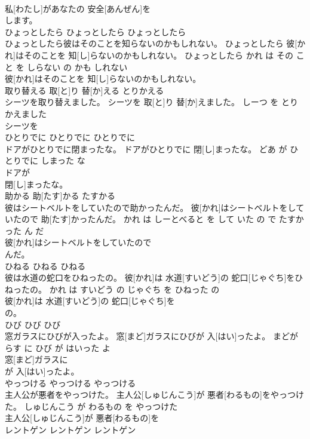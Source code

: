 \documentclass[8pt]{extreport}
\begin{document}
\begin{CJK}{UTF8}{min}
\\	私[わたし]があなたの 安全[あんぜん]を
\\	します。			
\\	ひょっとしたら	ひょっとしたら	ひょっとしたら	
\\	ひょっとしたら彼はそのことを知らないのかもしれない。	ひょっとしたら 彼[かれ]はそのことを 知[し]らないのかもしれない。	ひょっとしたら かれ は その こと を しらない の かも しれない	
\\	彼[かれ]はそのことを 知[し]らないのかもしれない。			
\\	取り替える	取[と]り 替[か]える	とりかえる	
\\	シーツを取り替えました。	シーツを 取[と]り 替[か]えました。	しーつ を とりかえました	
\\	シーツを
\\	ひとりでに	ひとりでに	ひとりでに	
\\	ドアがひとりでに閉まったな。	ドアがひとりでに 閉[し]まったな。	どあ が ひとりでに しまった な	
\\	ドアが
\\	閉[し]まったな。			
\\	助かる	助[たす]かる	たすかる	
\\	彼はシートベルトをしていたので助かったんだ。	彼[かれ]はシートベルトをしていたので 助[たす]かったんだ。	かれ は しーとべると を して いた の で たすかった ん だ	
\\	彼[かれ]はシートベルトをしていたので
\\	んだ。			
\\	ひねる	ひねる	ひねる	
\\	彼は水道の蛇口をひねったの。	彼[かれ]は 水道[すいどう]の 蛇口[じゃぐち]をひねったの。	かれ は すいどう の じゃぐち を ひねった の	
\\	彼[かれ]は 水道[すいどう]の 蛇口[じゃぐち]を
\\	の。			
\\	ひび	ひび	ひび	
\\	窓ガラスにひびが入ったよ。	窓[まど]ガラスにひびが 入[はい]ったよ。	まどがらす に ひび が はいった よ	
\\	窓[まど]ガラスに
\\	が 入[はい]ったよ。			
\\	やっつける	やっつける	やっつける	
\\	主人公が悪者をやっつけた。	主人公[しゅじんこう]が 悪者[わるもの]をやっつけた。	しゅじんこう が わるもの を やっつけた	
\\	主人公[しゅじんこう]が 悪者[わるもの]を
\\	レントゲン	レントゲン	レントゲン	

\end{CJK}
\end{document}
